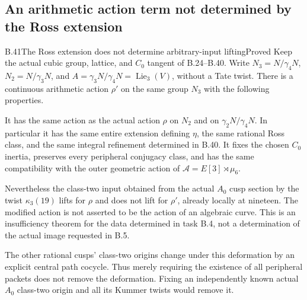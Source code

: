 \subsection{An arithmetic action term not determined by the Ross extension}

\begin{statement}{B.41}{The Ross extension does not determine arbitrary-input lifting}{Proved}
Keep the actual cubic group, lattice, and $C_0$ tangent of B.24--B.40.
Write $N_3=N/\gamma_4N$, $N_2=N/\gamma_3N$, and
$A=\gamma_3N/\gamma_4N=\operatorname{Lie}_3(V)$, without a Tate twist.
There is a continuous arithmetic action $\rho'$ on the same group
$N_3$ with the following properties.

It has the same action as the actual action $\rho$ on $N_2$ and on
$\gamma_2N/\gamma_4N$.  In particular it has the same entire
extension defining $\eta$, the same rational Ross class, and the
same integral refinement determined in B.40.  It fixes the chosen
$C_0$ inertia, preserves every peripheral conjugacy class, and has
the same compatibility with the outer geometric action of
$\mathcal A=E[3]\rtimes\mu_6$.

Nevertheless the class-two input obtained from the actual $A_0$
cusp section by the twist $\kappa_3(19)$ lifts for $\rho$ and does
not lift for $\rho'$, already locally at nineteen.  The modified
action is not asserted to be the action of an algebraic curve.
This is an insufficiency theorem for the data determined in task
B.4, not a determination of the actual image requested in B.5.

The other rational cusps' class-two origins change under this
deformation by an explicit central path cocycle.  Thus merely
requiring the existence of all peripheral packets does not remove
the deformation.  Fixing an independently known actual $A_0$
class-two origin and all its Kummer twists would remove it.
\end{statement}
